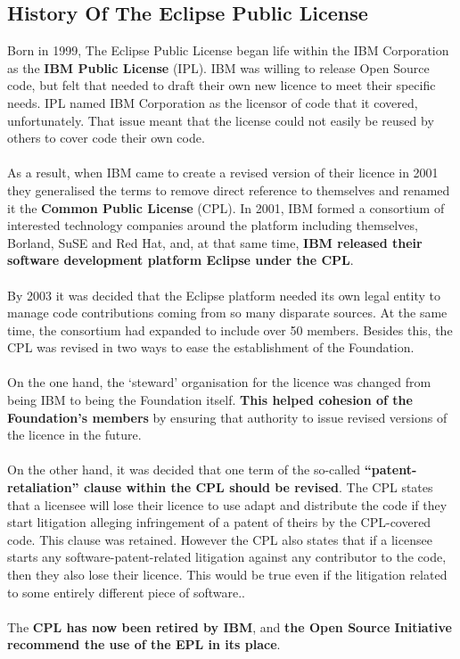 \documentclass[a4paper, 12pt]{book}
\begin{document}
\subsection{History Of The Eclipse Public License}
Born in 1999, The Eclipse Public License began life within the IBM Corporation as the \textbf{IBM Public License} (IPL). IBM was willing to release Open Source code, but felt that needed to draft their own new licence to meet their specific needs. IPL named IBM Corporation as the licensor of code that it covered, unfortunately. That issue meant that the license could not easily be reused by others to cover code their own code.\\
\\
As a result, when IBM came to create a revised version of their licence in 2001 they generalised the terms to remove direct reference to themselves and renamed it the \textbf{Common Public License} (CPL). In 2001, IBM formed a consortium of interested technology companies around the platform including themselves, Borland, SuSE and Red Hat, and, at that same time, \textbf{IBM released their software development platform Eclipse under the CPL}.\\
\\
By 2003 it was decided that the Eclipse platform needed its own legal entity to manage code contributions coming from so many disparate sources. At the same time, the consortium had expanded to include over 50 members. Besides this, the CPL was revised in two ways to ease the establishment of the Foundation.\\
\\
On the one hand, the ‘steward’ organisation for the licence was changed from being IBM to being the Foundation itself. \textbf{This helped cohesion of the Foundation’s members} by ensuring that authority to issue revised versions of the licence in the future.\\
\\
On the other hand, it was decided that one term of the so-called \textbf{``patent-retaliation'' clause within the CPL should be revised}. The CPL states that a licensee will lose their licence to use adapt and distribute the code if they start litigation alleging infringement of a patent of theirs by the CPL-covered code. This clause was retained. However the CPL also states that if a licensee starts any software-patent-related litigation against any contributor to the code, then they also lose their licence. This would be true even if the litigation related to some entirely different piece of software..\\
\\
The \textbf{CPL has now been retired by IBM}, and \textbf{the Open Source Initiative recommend the use of the EPL in its place}.
\end{document}

